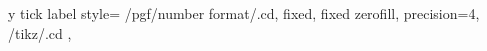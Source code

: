 y tick label style={
        /pgf/number format/.cd,
            fixed,
            fixed zerofill,
            precision=4,
        /tikz/.cd
    },
